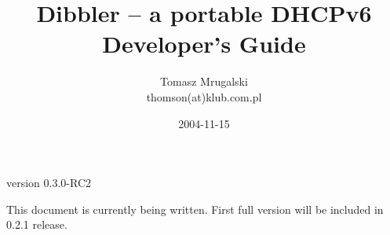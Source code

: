 \documentclass[10pt]{article}
\author{Tomasz Mrugalski\\ \small{thomson(at)klub.com.pl}}
\date{2004-11-15}
\title{Dibbler -- a portable DHCPv6\\Developer's Guide}
\begin{document}
\vspace{-2cm}
\maketitle
\vspace{-1cm}
\begin{center}
version 0.3.0-RC2
\end{center}

\tableofcontents

This document is currently being written. First full version will be
included in 0.2.1 release.










\end{document}
